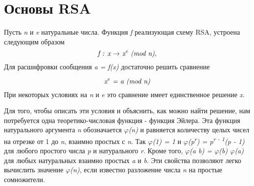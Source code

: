 \section{Основы RSA}

\paragraph{} Пусть \textit{n} и \textit{e} натуральные числа. Функция \textit{f} реализующая схему RSA, устроена следующим образом
\begin{equation}
  \textit{f : x {$\rightarrow$} x\textsuperscript{e} (mod n)},
\end{equation}
Для расшифровки сообщения \textit{a = f(x)} достаточно решить сравнение 

\begin{equation}
  \textit{x\textsuperscript{e} = a (mod n)} 
\end{equation}
При некоторых условиях на \textit{n} и \textit{e} это сравнение имеет единственное решение \textit{x}.

  Для того, чтобы описать эти условия и объяснить, как можно найти решение, нам потребуется одна теоретико-числовая функция - функция Эйлера. 
Эта функция натурального аргумента \textit{n} обозначается \textit{{$\varphi$}(n)} и равняется количеству целых чисел на отрезке от 1 до \textit{n}, 
взаимно простых с \textit{n}. Так \textit{{$\varphi$}(1) = 1} и \textit{{$\varphi$}(p\textsuperscript{r}) = p\textsuperscript{r - 1}(p - 1)} 
для любого простого числа \textit{p} и натурального \textit{r}. Кроме того, \textit{{$\varphi$}(a b) = {$\varphi$}(b) {$\varphi$}(a)} 
для любых натуральных взаимно простых \textit{a} и \textit{b}. Эти свойства позволяют легко вычислить значение \textit{{$\varphi$}(n)}, если известно 
разложение числа \textit{n} на простые сомножители. 

